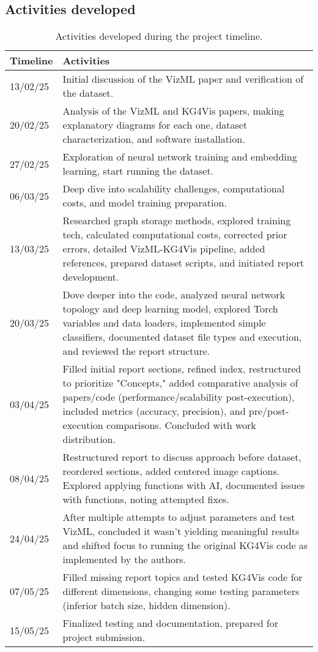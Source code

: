 \subsection{Activities developed}

\begin{table}[h!]
\centering
\caption{Activities developed during the project timeline.}
\begin{tabular}{|l|p{10cm}|}
\hline
\textbf{Timeline} & \textbf{Activities} \\
\hline
13/02/25 & Initial discussion of the VizML paper and verification of the dataset. \\
\hline
20/02/25 & Analysis of the VizML and KG4Vis papers, making explanatory diagrams for each one, dataset characterization, and software installation. \\
\hline
27/02/25 & Exploration of neural network training and embedding learning, start running the dataset. \\
\hline
06/03/25 & Deep dive into scalability challenges, computational costs, and model training preparation. \\
\hline
13/03/25 & Researched graph storage methods, explored training tech, calculated computational costs, corrected prior errors, detailed VizML-KG4Vis pipeline, added references, prepared dataset scripts, and initiated report development. \\
\hline
20/03/25 & Dove deeper into the code, analyzed neural network topology and deep learning model, explored Torch variables and data loaders, implemented simple classifiers, documented dataset file types and execution, and reviewed the report structure. \\
\hline
03/04/25 & Filled initial report sections, refined index, restructured to prioritize "Concepts," added comparative analysis of papers/code (performance/scalability post-execution), included metrics (accuracy, precision), and pre/post-execution comparisons. Concluded with work distribution. \\
\hline
08/04/25 & Restructured report to discuss approach before dataset, reordered sections, added centered image captions. Explored applying functions with AI, documented issues with functions, noting attempted fixes. \\
\hline
24/04/25 & After multiple attempts to adjust parameters and test VizML, concluded it wasn't yielding meaningful results and shifted focus to running the original KG4Vis code as implemented by the authors. \\
\hline
07/05/25 & Filled missing report topics and tested KG4Vis code for different dimensions, changing some testing parameters (inferior batch size, hidden dimension). \\
\hline
15/05/25 & Finalized testing and documentation, prepared for project submission. \\ 
\hline
\end{tabular}
\end{table}






